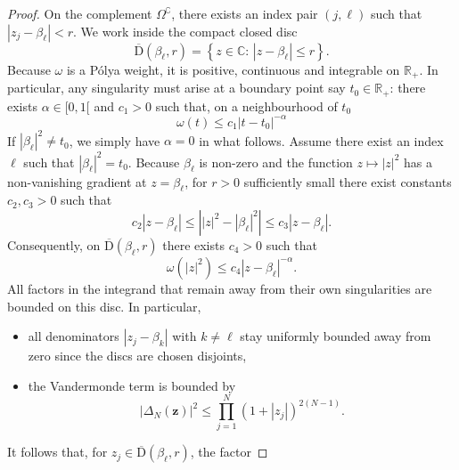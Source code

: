 \documentclass[pdflatex,sn-mathphys-num]{sn-jnl}
\theoremstyle{thmstyleone}
\numberwithin{equation}{section}
\begin{document}
\begin{proof}
    On the complement $\Omega^{\complement}$, there exists an index pair $(j,\ell)$ such that $\left|z_{j}-\beta_{\ell}\right|< r$. We work inside the compact closed disc 
    \begin{equation}
        \overline{\mathrm{D}}(\beta_{\ell},r)=\left\{ z\in\mathbb{C}:\,\left| z-\beta_{\ell} \right|\leq r \right\}.
    \end{equation}
    Because $\omega$ is a P\'olya weight, it is positive, continuous and integrable on $\mathbb{R}_{+}$. In particular, any singularity must arise at a boundary point say $t_{0}\in\mathbb{R}_{+}$: there exists $\alpha\in[0,1[$ and $c_{1}>0$ such that, on a neighbourhood of $t_{0}$
    \begin{equation*}
        \omega(t)\leq c_{1}\left|t-t_{0}\right|^{-\alpha}
    \end{equation*}
    If $\left|\beta_{\ell}\right|^{2}\neq t_{0}$, we simply have $\alpha=0$ in what follows. Assume there exist an index $\ell$ such that $\left|\beta_{\ell}\right|^{2}= t_{0}$. Because $\beta_{\ell}$ is non-zero and the function $z\mapsto \left|z\right|^{2}$ has a non-vanishing gradient at $z=\beta_{\ell}$, for $r>0$ sufficiently small there exist constants $c_{2},c_{3}>0$ such that
    \begin{equation*}
        c_{2}\left|z-\beta_{\ell}\right|\leq \left|\left|z\right|^{2}-\left|\beta_{\ell}\right|^{2}\right| \leq c_{3}\left|z-\beta_{\ell}\right|.
    \end{equation*}
    Consequently, on $\overline{\mathrm{D}}(\beta_{\ell},r)$ there exists $c_{4}>0$ such that
    \begin{equation*}
        \omega(\left|z\right|^{2})\leq c_{4}\left|z-\beta_{\ell}\right|^{-\alpha}.
    \end{equation*}
    All factors in the integrand that remain away from their own singularities are bounded on this disc. In particular,
    \begin{itemize}
        \item all denominators $\left|z_{j}-\beta_{k}\right|$ with $k\neq \ell$ stay uniformly bounded away from zero since the discs are chosen disjoints,
        \item the Vandermonde term is bounded by
        \begin{equation*}
            \left|\Delta_{N}(\mathbf{z})\right|^{2}\leq \prod_{j=1}^{N}(1+\left|z_{j}\right|)^{2(N-1)}.
        \end{equation*}
    \end{itemize}
    It follows that, for $z_{j}\in \overline{\mathrm{D}}(\beta_{\ell},r)$, the factor

\end{proof}
\end{document}
